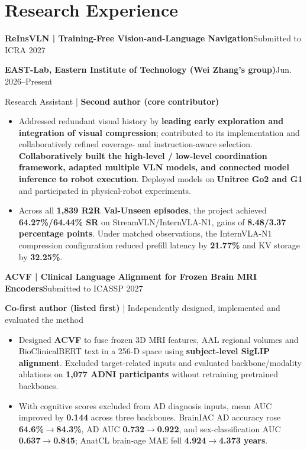 \documentclass[11pt,a4paper]{article}
\newcommand{\entry}[2]{\par\noindent\textbf{#1}\hfill #2\par}
\newcommand{\researchmeta}[1]{{\fontsize{9.8}{12}\selectfont #1\par}\vspace{1pt}}
\begin{document}
\section{Research Experience}
\entry{ReInsVLN | Training-Free Vision-and-Language Navigation}{Submitted to ICRA 2027}
\researchmeta{\textbf{EAST-Lab, Eastern Institute of Technology (Wei Zhang's group)}\hfill Jun. 2026--Present}
\researchmeta{Research Assistant | \textbf{Second author (core contributor)}}
\begin{itemize}
\item Addressed redundant visual history by \textbf{leading early exploration and integration of visual compression}; contributed to its implementation and collaboratively refined coverage- and instruction-aware selection. \textbf{Collaboratively built the high-level / low-level coordination framework, adapted multiple VLN models, and connected model inference to robot execution}. Deployed models on \textbf{Unitree Go2 and G1} and participated in physical-robot experiments.
\item Across all \textbf{1,839 R2R Val-Unseen episodes}, the project achieved \textbf{64.27\%/64.44\% SR} on StreamVLN/InternVLA-N1, gains of \textbf{8.48/3.37 percentage points}. Under matched observations, the InternVLA-N1 compression configuration reduced prefill latency by \textbf{21.77\%} and KV storage by \textbf{32.25\%}.
\end{itemize}

\vspace{3pt}
\entry{ACVF | Clinical Language Alignment for Frozen Brain MRI Encoders}{Submitted to ICASSP 2027}
\researchmeta{\textbf{Co-first author (listed first)} | Independently designed, implemented and evaluated the method}
\begin{itemize}
\item Designed \textbf{ACVF} to fuse frozen 3D MRI features, AAL regional volumes and BioClinicalBERT text in a 256-D space using \textbf{subject-level SigLIP alignment}. Excluded target-related inputs and evaluated backbone/modality ablations on \textbf{1,077 ADNI participants} without retraining pretrained backbones.
\item With cognitive scores excluded from AD diagnosis inputs, mean AUC improved by \textbf{0.144} across three backbones. BrainIAC AD accuracy rose \textbf{64.6\%$\rightarrow$84.3\%}, AD AUC \textbf{0.732$\rightarrow$0.922}, and sex-classification AUC \textbf{0.637$\rightarrow$0.845}; AnatCL brain-age MAE fell \textbf{4.924$\rightarrow$4.373 years}.
\end{itemize}
\end{document}
